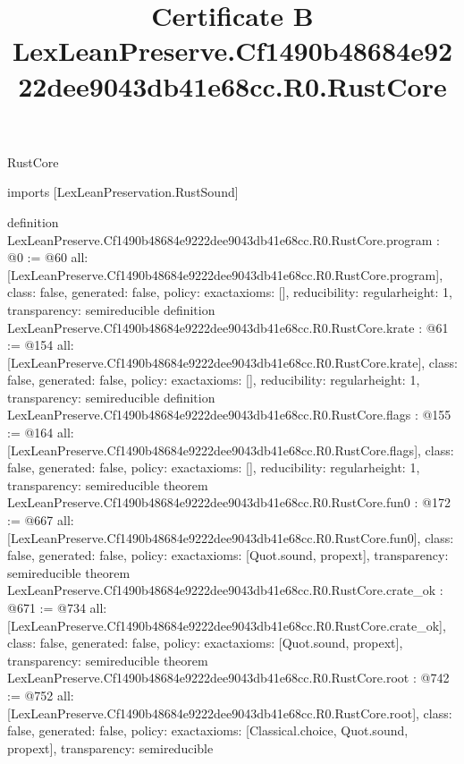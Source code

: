 \begin{lexlean}{RustCore}
\title{Certificate B LexLeanPreserve.Cf1490b48684e9222dee9043db41e68cc.R0.RustCore}
\begin{coremodule}
imports [LexLeanPreservation.RustSound]

definition LexLeanPreserve.Cf1490b48684e9222dee9043db41e68cc.R0.RustCore.program : @0 := @60 {
  all: [LexLeanPreserve.Cf1490b48684e9222dee9043db41e68cc.R0.RustCore.program],
  class: false,
  generated: false,
  policy: exact{axioms: []},
  reducibility: regular{height: 1},
  transparency: semireducible
}
definition LexLeanPreserve.Cf1490b48684e9222dee9043db41e68cc.R0.RustCore.krate : @61 := @154 {
  all: [LexLeanPreserve.Cf1490b48684e9222dee9043db41e68cc.R0.RustCore.krate],
  class: false,
  generated: false,
  policy: exact{axioms: []},
  reducibility: regular{height: 1},
  transparency: semireducible
}
definition LexLeanPreserve.Cf1490b48684e9222dee9043db41e68cc.R0.RustCore.flags : @155 := @164 {
  all: [LexLeanPreserve.Cf1490b48684e9222dee9043db41e68cc.R0.RustCore.flags],
  class: false,
  generated: false,
  policy: exact{axioms: []},
  reducibility: regular{height: 1},
  transparency: semireducible
}
theorem LexLeanPreserve.Cf1490b48684e9222dee9043db41e68cc.R0.RustCore.fun0 : @172 := @667 {
  all: [LexLeanPreserve.Cf1490b48684e9222dee9043db41e68cc.R0.RustCore.fun0],
  class: false,
  generated: false,
  policy: exact{axioms: [Quot.sound, propext]},
  transparency: semireducible
}
theorem LexLeanPreserve.Cf1490b48684e9222dee9043db41e68cc.R0.RustCore.crate_ok : @671 := @734 {
  all: [LexLeanPreserve.Cf1490b48684e9222dee9043db41e68cc.R0.RustCore.crate_ok],
  class: false,
  generated: false,
  policy: exact{axioms: [Quot.sound, propext]},
  transparency: semireducible
}
theorem LexLeanPreserve.Cf1490b48684e9222dee9043db41e68cc.R0.RustCore.root : @742 := @752 {
  all: [LexLeanPreserve.Cf1490b48684e9222dee9043db41e68cc.R0.RustCore.root],
  class: false,
  generated: false,
  policy: exact{axioms: [Classical.choice, Quot.sound, propext]},
  transparency: semireducible
}


\end{coremodule}
\end{lexlean}
